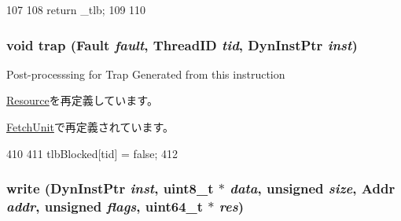 \begin{DoxyCode}
107 {
108     return _tlb;
109 
110 }
\end{DoxyCode}
\hypertarget{classCacheUnit_abf76d6d245f7d3b17d26ea8dcc0cf36f}{
\subsubsection[{trap}]{\setlength{\rightskip}{0pt plus 5cm}void trap ({\bf Fault} {\em fault}, \/  {\bf ThreadID} {\em tid}, \/  {\bf DynInstPtr} {\em inst})}}
\label{classCacheUnit_abf76d6d245f7d3b17d26ea8dcc0cf36f}
Post-\/processsing for Trap Generated from this instruction 

\hyperlink{classResource_a1eb2a0229740a87bde0282416035b864}{Resource}を再定義しています。

\hyperlink{classFetchUnit_abf76d6d245f7d3b17d26ea8dcc0cf36f}{FetchUnit}で再定義されています。


\begin{DoxyCode}
410 {
411     tlbBlocked[tid] = false;
412 }
\end{DoxyCode}
\hypertarget{classCacheUnit_abd0bcff6bbdb03d0ad191f96774e8a8b}{
\subsubsection[{write}]{ write ({\bf DynInstPtr} {\em inst}, \/  uint8\_\-t $\ast$ {\em data}, \/  unsigned {\em size}, \/  {\bf Addr} {\em addr}, \/  unsigned {\em flags}, \/  uint64\_\-t $\ast$ {\em res})}}
\label{classCacheUnit_abd0bcff6bbdb03d0ad191f96774e8a8b}



